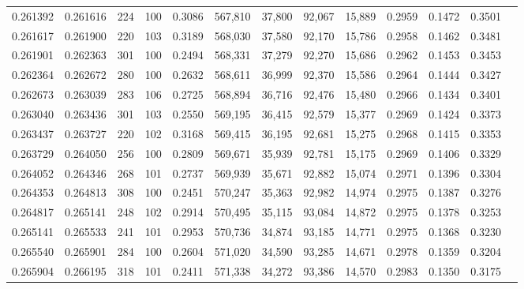 \begin{tabular}{rrrrrrrrrrrrr}
0.261392 & 0.261616 &   224 & 100 &                                     0.3086 & 567,810 &  37,800 &  92,067 &  15,889 & 0.2959 & 0.1472 & 0.3501 \\
0.261617 & 0.261900 &   220 & 103 &                                     0.3189 & 568,030 &  37,580 &  92,170 &  15,786 & 0.2958 & 0.1462 & 0.3481 \\
0.261901 & 0.262363 &   301 & 100 &                                     0.2494 & 568,331 &  37,279 &  92,270 &  15,686 & 0.2962 & 0.1453 & 0.3453 \\
0.262364 & 0.262672 &   280 & 100 &                                     0.2632 & 568,611 &  36,999 &  92,370 &  15,586 & 0.2964 & 0.1444 & 0.3427 \\
0.262673 & 0.263039 &   283 & 106 &                                     0.2725 & 568,894 &  36,716 &  92,476 &  15,480 & 0.2966 & 0.1434 & 0.3401 \\
0.263040 & 0.263436 &   301 & 103 &                                     0.2550 & 569,195 &  36,415 &  92,579 &  15,377 & 0.2969 & 0.1424 & 0.3373 \\
0.263437 & 0.263727 &   220 & 102 &                                     0.3168 & 569,415 &  36,195 &  92,681 &  15,275 & 0.2968 & 0.1415 & 0.3353 \\
0.263729 & 0.264050 &   256 & 100 &                                     0.2809 & 569,671 &  35,939 &  92,781 &  15,175 & 0.2969 & 0.1406 & 0.3329 \\
0.264052 & 0.264346 &   268 & 101 &                                     0.2737 & 569,939 &  35,671 &  92,882 &  15,074 & 0.2971 & 0.1396 & 0.3304 \\
0.264353 & 0.264813 &   308 & 100 &                                     0.2451 & 570,247 &  35,363 &  92,982 &  14,974 & 0.2975 & 0.1387 & 0.3276 \\
0.264817 & 0.265141 &   248 & 102 &                                     0.2914 & 570,495 &  35,115 &  93,084 &  14,872 & 0.2975 & 0.1378 & 0.3253 \\
0.265141 & 0.265533 &   241 & 101 &                                     0.2953 & 570,736 &  34,874 &  93,185 &  14,771 & 0.2975 & 0.1368 & 0.3230 \\
0.265540 & 0.265901 &   284 & 100 &                                     0.2604 & 571,020 &  34,590 &  93,285 &  14,671 & 0.2978 & 0.1359 & 0.3204 \\
0.265904 & 0.266195 &   318 & 101 &                                     0.2411 & 571,338 &  34,272 &  93,386 &  14,570 & 0.2983 & 0.1350 & 0.3175 \\

\end{tabular}
